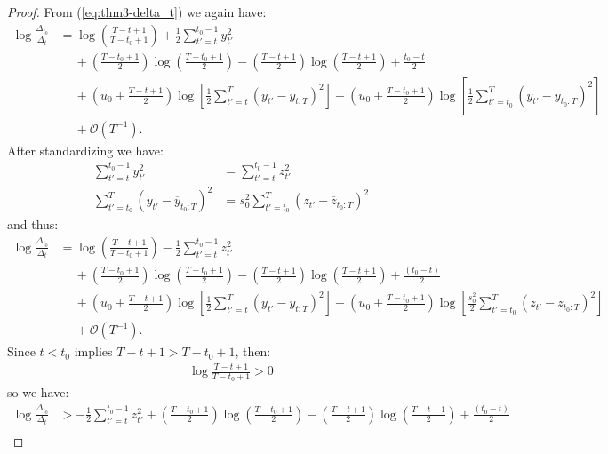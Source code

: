 \begin{proof}
From (\ref{eq:thm3-delta_t}) we again have:
\begin{align*}
    \log \frac{\Delta_{t_0}}{\Delta_t} &= \log \left(\frac{T - t + 1}{T - t_0 +1} \right) + \frac{1}{2} \sum_{t' = t}^{t_0 - 1} y_{t'}^2 \\
    &\quad\: + \left(\frac{T - t_0 + 1}{2}\right) \log\left(\frac{T-t_0+1}{2}\right) - \left(\frac{T - t + 1}{2}\right) \log\left(\frac{T-t+1}{2}\right) + \frac{t_0-t}{2} \\
    &\quad\: + \left(u_0 + \frac{T - t +1}{2}\right)\log\left[ \frac{1}{2}\sum_{t'=t}^T (y_{t'} - \overline{y}_{t:T})^2 \right]  - \left(u_0 + \frac{T - t_0 +1}{2}\right)\log\left[\frac{1}{2}\sum_{t'=t_0}^T (y_{t'} - \overline{y}_{t_0:T})^2 \right] \\
    &\quad\: + \mathcal{O}(T^{-1}).
\end{align*}
After standardizing we have:
\begin{align*}
    \sum_{t' = t}^{t_0 - 1} y_{t'}^2 &= \sum_{t' = t}^{t_0 - 1} z_{t'}^2 \\
    \sum_{t'=t_0}^T (y_{t'} - \overline{y}_{t_0:T})^2 &= s_0^2 \sum_{t'=t_0}^T  (z_{t'} - \overline{z}_{t_0:T})^2
\end{align*}
and thus:
\begin{align*}
    \log \frac{\Delta_{t_0}}{\Delta_t} &= \log \left(\frac{T - t + 1}{T - t_0 + 1} \right) - \frac{1}{2} \sum_{t' = t}^{t_0 - 1} z_{t'}^2 \\
    &\quad\: + \left(\frac{T - t_0 + 1}{2}\right) \log\left(\frac{T-t_0+1}{2}\right) - \left(\frac{T - t + 1}{2}\right) \log\left(\frac{T-t+1}{2}\right) + \frac{(t_0-t)}{2} \\
    &\quad\: + \left(u_0 + \frac{T - t +1}{2}\right)\log\left[ \frac{1}{2}\sum_{t'=t}^T (y_{t'} - \overline{y}_{t:T})^2 \right]- \left(u_0 + \frac{T - t_0 +1}{2}\right)\log\left[\frac{s_0^2}{2}\sum_{t'=t_0}^T  (z_{t'} - \overline{z}_{t_0:T})^2 \right] \\
    &\quad\: +  \mathcal{O}(T^{-1}). 
\end{align*}
Since $t < t_0$ implies $T-t + 1> T-t_0 +1$, then:
\begin{align*}
    \log\frac{T-t+1}{T-t_0+1} > 0
\end{align*}
so we have:
\begin{align*}
    \log \frac{\Delta_{t_0}}{\Delta_t} &> - \frac{1}{2} \sum_{t' = t}^{t_0 - 1} z_{t'}^2  + \left(\frac{T - t_0+1}{2}\right) \log\left(\frac{T-t_0+1}{2}\right) - \left(\frac{T - t+1}{2}\right) \log\left(\frac{T-t+1}{2}\right) + \frac{(t_0-t)}{2} \\

\end{align*}
\end{proof}
